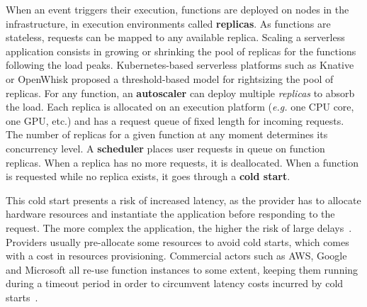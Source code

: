 When an event triggers their execution, functions are deployed on nodes in the infrastructure, in execution environments called \textbf{replicas}. As functions are stateless, requests can be mapped to any available replica. Scaling a serverless application 
consists in growing or shrinking the pool of replicas for the functions following the load peaks. Kubernetes-based serverless platforms such as Knative \cite{knative} or OpenWhisk \cite{openwhisk} proposed a threshold-based model for rightsizing the pool of replicas. For any function, an \textbf{autoscaler} can deploy multiple \textit{replicas} to absorb the load. Each replica is allocated on an execution platform (\textit{e.g.} one CPU core, one GPU, etc.) and has a request queue of fixed length for incoming requests. The number of replicas for a given function at any moment determines its concurrency level. A \textbf{scheduler} places user requests in queue on function replicas. When a replica has no more requests, it is deallocated. When a function is requested while no replica exists, it goes through a \textbf{cold start}.%

This cold start presents a risk of increased latency, as the provider has to allocate hardware resources and instantiate the application before responding to the request. The more complex the application, the higher the risk of large delays~\cite{mohanAgileColdStartsa}. Providers usually pre-allocate some resources to avoid cold starts, which comes with a cost in resources provisioning. Commercial actors such as AWS, Google and Microsoft all re-use function instances to some extent, keeping them running during a timeout period in order to circumvent latency costs incurred by cold starts~\cite{vahidiniaColdStartServerless2020}.

